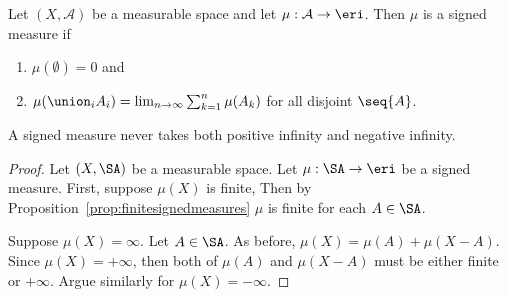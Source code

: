 
Let
$(X, \mathcal{A})$
be a measurable space
and let
$\mu: \mathcal{A} \to \eri$.
Then $\mu$ is a signed measure if
\begin{enumerate}
  \item $\mu(\emptyset) = 0$ and
  \item
  $\mu(\union_{i} A_i) =
    \lim_{n \to \infty}
      \sum_{k = 1}^{n} \mu(A_k)$
  for all disjoint $\seq{A}$.
\end{enumerate}

\begin{prop}
A signed measure never takes
both positive infinity and
negative infinity.
\begin{proof}
Let $(X,\SA)$ be a measurable space.
Let $\mu: \SA \to \eri$ be a signed measure.
First, suppose $\mu(X)$ is finite,
Then by
Proposition~\ref{prop:finitesignedmeasures}
$\mu$ is finite for each $A \in \SA$.

Suppose $\mu(X) = \infty$.
Let $A \in \SA$.
As before,
$\mu(X) = \mu(A) + \mu(X - A)$.
Since $\mu(X) = +\infty$, then
both of $\mu(A)$ and $\mu(X-A)$
must be either finite or $+\infty$.
Argue similarly for $\mu(X) = -\infty$.
\end{proof}
\end{prop}
\strats
